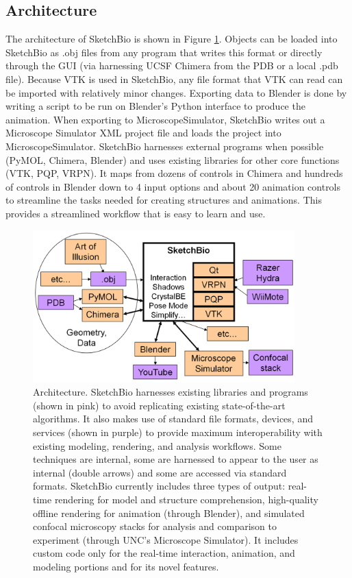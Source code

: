 \documentclass[twocolumn]{bmcart}%
\begin{document}
\subsection*{Architecture}

The architecture of SketchBio is shown in Figure \ref{fig:architecture}.
Objects can be loaded into SketchBio as .obj files from any program that writes this format or directly through the GUI (via harnessing UCSF Chimera from the PDB or a local .pdb file).
Because VTK is used in SketchBio, any file format that VTK can read can be imported with relatively minor changes.
Exporting data to Blender is done by writing a script to be run on Blender's Python interface to produce the animation.
When exporting to MicroscopeSimulator, SketchBio writes out a Microscope Simulator XML project file and loads the project into MicroscopeSimulator.
SketchBio harnesses external programs when possible (PyMOL, Chimera, Blender) and uses existing libraries for other core functions (VTK, PQP, VRPN).
It maps from dozens of controls in Chimera and hundreds of controls in Blender down to 4 input options and about 20 animation controls to streamline the tasks needed for creating structures and animations.
This provides a streamlined workflow that is easy to learn and use.

\begin{figure}[ht]
    \begin{center}
    \noindent\includegraphics[width=0.9\textwidth]
    {system_diagram.png}
    \end{center}
\caption{Architecture.
SketchBio harnesses existing libraries and programs (shown in pink) to avoid replicating existing state-of-the-art algorithms.
It also makes use of standard file formats, devices, and services (shown in purple) to provide maximum interoperability with existing modeling, rendering, and analysis workflows.
Some techniques are internal, some are harnessed to appear to the user as internal (double arrows) and some are accessed via standard formats.
SketchBio currently includes three types of output: real-time rendering for model and structure comprehension, high-quality offline rendering for animation (through Blender), and simulated confocal microscopy stacks for analysis and comparison to experiment (through UNC's Microscope Simulator).
It includes custom code only for the real-time interaction, animation, and modeling portions and for its novel features.}
\label{fig:architecture}
\end{figure}
\end{document}
